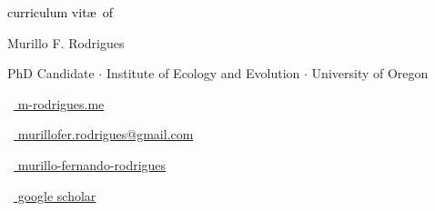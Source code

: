\begin{scriptsize}
	 \textcolor{black}{curriculum vit\ae~of}
\end{scriptsize}

\vspace*{-0.10em}
\begin{Large} 
    Murillo F. Rodrigues	
\end{Large}

\vspace*{0.25em}
\begin{scshape}
	\begin{footnotesize}
		  \textcolor{highlight2}{PhD Candidate $\cdot$ Institute of Ecology and Evolution $\cdot$ University of Oregon}
		  
	\end{footnotesize}
\end{scshape}
\vspace*{0.4cm}

\begin{footnotesize}
	\begin{tiny}\faHome\end{tiny}~\href{https://m-rodrigues.me}{
		m-rodrigues.me
	}
	\quad \begin{tiny}\faEnvelope[regular]\end{tiny}~\href{mailto:murillofer.rodrigues@gmail.com}{%
		murillofer.rodrigues@gmail.com
	} 
	
	\begin{tiny}\faLinkedinIn\end{tiny}~\href{https://www.linkedin.com/in/murillo-fernando-rodrigues-28162b106/}{
		murillo-fernando-rodrigues
	}
	\quad 
	\begin{tiny}\faGraduationCap\end{tiny}~\href{https://scholar.google.com/citations?user=GyBZOK0AAAAJ&hl=en}{
		 google scholar
		}

\end{footnotesize}
